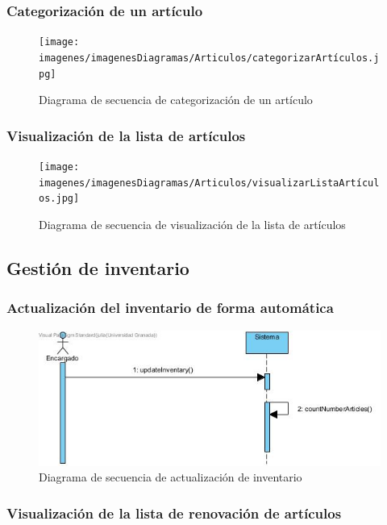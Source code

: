 \subsubsection{Categorización de un artículo}

\begin{figure}[H]
	\centering
	\texttt{[image: imagenes/imagenesDiagramas/Articulos/categorizarArtículos.jpg]}
	\caption{Diagrama de secuencia de categorización de un artículo}
	\label{fig:seqdiag8}
\end{figure}

\subsubsection{Visualización de la lista de artículos}

\begin{figure}[H]
	\centering
	\texttt{[image: imagenes/imagenesDiagramas/Articulos/visualizarListaArtículos.jpg]}
	\caption{Diagrama de secuencia de visualización de la lista de artículos}
	\label{fig:seqdiag9}
\end{figure}

\subsection{Gestión de inventario}

\subsubsection{Actualización del inventario de forma automática}

\begin{figure}[H]
	\centering
	\includegraphics[width=1\textwidth]{imagenes/imagenesDiagramas/Articulos/actualizarInventario.jpg}
	\caption{Diagrama de secuencia de actualización de inventario}
	\label{fig:seqdiag10}
\end{figure}

\subsubsection{Visualización de la lista de renovación de artículos}


